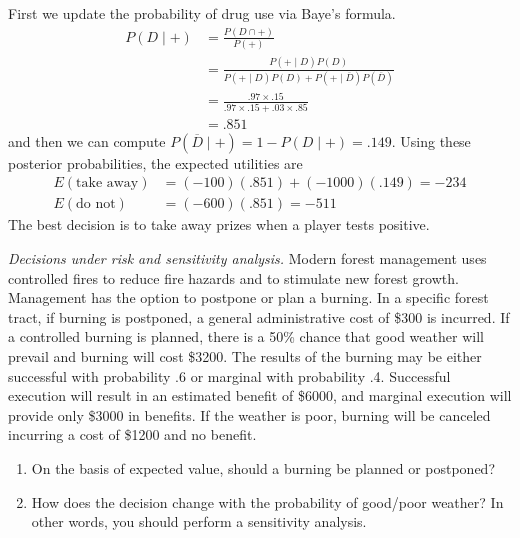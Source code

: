 \begin{solution}
\bs First we update the probability of drug use via Baye's formula.
\begin{align*}
P(D \mid +) &= \frac{P(D \cap +)}{P(+)} \\
&= \frac{P(+ \mid D)P(D)}{P(+ \mid D)P(D) + P(+ \mid \overline{D})P(\overline{D})} \\
&= \frac{.97 \times .15}{.97 \times .15 + .03 \times .85} \\
&= .851
\end{align*}
and then we can compute $P(\overline{D} \mid +) = 1 - P(D \mid +) = .149$.
Using these posterior probabilities, the expected utilities are
\begin{align*}
E(\text{take away}) &= (-100)(.851) + (-1000)(.149) = -234 \\
E(\text{do not}) &= (-600)(.851) = -511
\end{align*}
The best decision is to take away prizes when a player tests positive.
\end{solution}

\item \emph{Decisions under risk and sensitivity analysis.}
  Modern forest
  management uses controlled fires to reduce fire hazards and to
  stimulate new forest growth. Management has the option to postpone
  or plan a burning. In a specific forest tract, if burning is
  postponed, a general administrative cost of \$300 is incurred. If a
  controlled burning is planned, there is a 50\% chance that good
  weather will prevail and burning will cost \$3200. The results of
  the burning may be either successful with probability .6 or marginal
  with probability .4. Successful execution will result in an
  estimated benefit of \$6000, and marginal execution will provide
  only \$3000 in benefits. If the weather is poor, burning will be
  canceled incurring a cost of \$1200 and no benefit.

  \begin{enumerate}
  \item On the basis of expected value, should a burning
    be planned or postponed?
  \item How does the decision change with the probability of good/poor
    weather? \label{sen} In other words, you should perform a
    sensitivity analysis.
  \end{enumerate}

